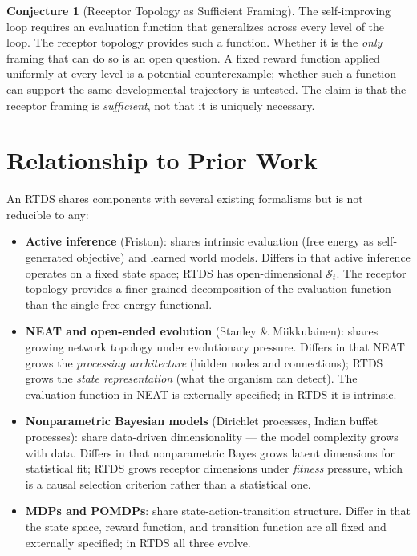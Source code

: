 \documentclass[12pt]{article}
\theoremstyle{definition}
\newtheorem{conjecture}{Conjecture}
\begin{document}
\begin{conjecture}[Receptor Topology as Sufficient Framing]
The self-improving loop requires an evaluation function that generalizes across every
level of the loop. The receptor topology provides such a function. Whether it is the
\emph{only} framing that can do so is an open question. A fixed reward function applied
uniformly at every level is a potential counterexample; whether such a function can
support the same developmental trajectory is untested. The claim is that the receptor
framing is \emph{sufficient}, not that it is uniquely necessary.
\end{conjecture}

\section{Relationship to Prior Work}

An RTDS shares components with several existing formalisms but is not reducible to any:

\begin{itemize}
    \item \textbf{Active inference} (Friston): shares intrinsic evaluation (free energy
    as self-generated objective) and learned world models. Differs in that active inference
    operates on a fixed state space; RTDS has open-dimensional $\mathcal{S}_t$. The
    receptor topology provides a finer-grained decomposition of the evaluation function
    than the single free energy functional.

    \item \textbf{NEAT and open-ended evolution} (Stanley \& Miikkulainen): shares
    growing network topology under evolutionary pressure. Differs in that NEAT grows
    the \emph{processing architecture} (hidden nodes and connections); RTDS grows the
    \emph{state representation} (what the organism can detect). The evaluation function
    in NEAT is externally specified; in RTDS it is intrinsic.

    \item \textbf{Nonparametric Bayesian models} (Dirichlet processes, Indian buffet
    processes): share data-driven dimensionality --- the model complexity grows with
    data. Differs in that nonparametric Bayes grows latent dimensions for statistical
    fit; RTDS grows receptor dimensions under \emph{fitness} pressure, which is a
    causal selection criterion rather than a statistical one.

    \item \textbf{MDPs and POMDPs}: share state-action-transition structure. Differ in
    that the state space, reward function, and transition function are all fixed and
    externally specified; in RTDS all three evolve.
\end{itemize}
\end{document}
